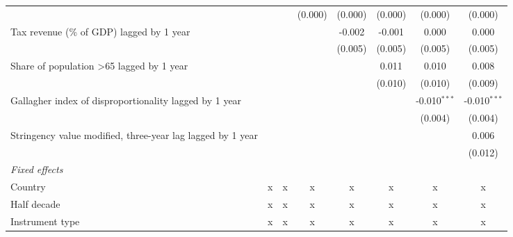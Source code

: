 \begin{tabular}{lccccccc}
                                                                                    &         &              & (0.000)       & (0.000)      & (0.000)      & (0.000)        & (0.000)\\   
   Tax revenue (\% of GDP) lagged by 1 year                                         &         &              &               & -0.002       & -0.001       & 0.000          & 0.000\\   
                                                                                    &         &              &               & (0.005)      & (0.005)      & (0.005)        & (0.005)\\   
   Share of population >65 lagged by 1 year                                         &         &              &               &              & 0.011        & 0.010          & 0.008\\   
                                                                                    &         &              &               &              & (0.010)      & (0.010)        & (0.009)\\   
   Gallagher index of disproportionality lagged by 1 year                           &         &              &               &              &              & -0.010$^{***}$ & -0.010$^{***}$\\   
                                                                                    &         &              &               &              &              & (0.004)        & (0.004)\\   
   Stringency value modified, three-year lag lagged by 1 year                       &         &              &               &              &              &                & 0.006\\   
                                                                                    &         &              &               &              &              &                & (0.012)\\   
   \emph{Fixed effects}\\
   Country                                                                          & x       & x            & x             & x            & x            & x              & x\\  
   Half decade                                                                      & x       & x            & x             & x            & x            & x              & x\\  
   Instrument type                                                                  & x       & x            & x             & x            & x            & x              & x\\  

\end{tabular}
